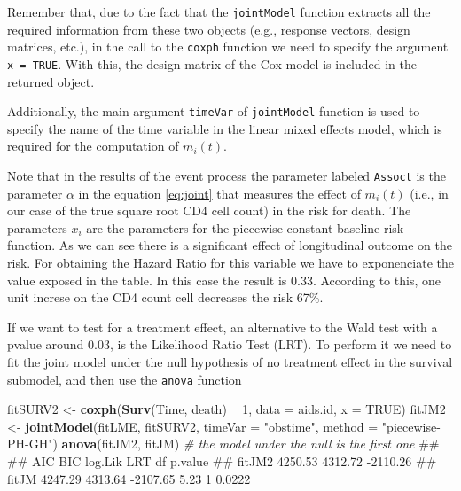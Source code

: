 \documentclass[]{book}
\makeatletter
\newenvironment{Shaded}{\begin{snugshade}}{\end{snugshade}}
\newcommand{\KeywordTok}[1]{\textcolor[rgb]{0.13,0.29,0.53}{\textbf{#1}}}
\newcommand{\DataTypeTok}[1]{\textcolor[rgb]{0.13,0.29,0.53}{#1}}
\newcommand{\DecValTok}[1]{\textcolor[rgb]{0.00,0.00,0.81}{#1}}
\newcommand{\StringTok}[1]{\textcolor[rgb]{0.31,0.60,0.02}{#1}}
\newcommand{\CommentTok}[1]{\textcolor[rgb]{0.56,0.35,0.01}{\textit{#1}}}
\newcommand{\OtherTok}[1]{\textcolor[rgb]{0.56,0.35,0.01}{#1}}
\newcommand{\OperatorTok}[1]{\textcolor[rgb]{0.81,0.36,0.00}{\textbf{#1}}}
\newcommand{\NormalTok}[1]{#1}
\newenvironment{kframe}{%
\medskip{}
\setlength{\fboxsep}{.8em}
 \def\at@end@of@kframe{}%
 \ifinner\ifhmode%
  \def\at@end@of@kframe{\end{minipage}}%
  \begin{minipage}{\columnwidth}%
 \fi\fi%
 \def\FrameCommand##1{\hskip\@totalleftmargin \hskip-\fboxsep
 \colorbox{shadecolor}{##1}\hskip-\fboxsep
     \hskip-\linewidth \hskip-\@totalleftmargin \hskip\columnwidth}%
 \MakeFramed {\advance\hsize-\width
   \@totalleftmargin\z@ \linewidth\hsize
   \@setminipage}}%
 {\par\unskip\endMakeFramed%
 \at@end@of@kframe}
\renewenvironment{Shaded}{\begin{kframe}}{\end{kframe}}
\theoremstyle{definition}
\theoremstyle{definition}
\theoremstyle{definition}
\theoremstyle{remark}
\let\BeginKnitrBlock\begin \let\EndKnitrBlock\end
\makeatother
\begin{document}
\BeginKnitrBlock{rmdhint_sestelo}
Remember that, due to the fact that the \texttt{jointModel} function
extracts all the required information from these two objects (e.g.,
response vectors, design matrices, etc.), in the call to the
\texttt{coxph} function we need to specify the argument
\texttt{x\ =\ TRUE}. With this, the design matrix of the Cox model is
included in the returned object.

Additionally, the main argument \texttt{timeVar} of \texttt{jointModel}
function is used to specify the name of the time variable in the linear
mixed effects model, which is required for the computation of
\(m_i(t)\).
\EndKnitrBlock{rmdhint_sestelo}

Note that in the results of the event process the parameter labeled
\texttt{Assoct} is the parameter \(\alpha\) in the equation
\eqref{eq:joint} that measures the effect of \(m_i(t)\) (i.e., in our case
of the true square root CD4 cell count) in the risk for death. The
parameters \(x_i\) are the parameters for the piecewise constant
baseline risk function. As we can see there is a significant effect of
longitudinal outcome on the risk. For obtaining the Hazard Ratio for
this variable we have to exponenciate the value exposed in the table. In
this case the result is 0.33. According to this, one unit increse on the
CD4 count cell decreases the risk 67\%.

If we want to test for a treatment effect, an alternative to the Wald
test with a pvalue around 0.03, is the Likelihood Ratio Test (LRT). To
perform it we need to fit the joint model under the null hypothesis of
no treatment effect in the survival submodel, and then use the
\texttt{anova} function

\begin{Shaded}
\begin{Highlighting}[]
\NormalTok{fitSURV2 <-}\StringTok{ }\KeywordTok{coxph}\NormalTok{(}\KeywordTok{Surv}\NormalTok{(Time, death) }\OperatorTok{~}\StringTok{ }\DecValTok{1}\NormalTok{, }\DataTypeTok{data =}\NormalTok{ aids.id, }\DataTypeTok{x =} \OtherTok{TRUE}\NormalTok{)}
\NormalTok{fitJM2 <-}\StringTok{ }\KeywordTok{jointModel}\NormalTok{(fitLME, fitSURV2, }\DataTypeTok{timeVar =} \StringTok{"obstime"}\NormalTok{, }\DataTypeTok{method =} \StringTok{"piecewise-PH-GH"}\NormalTok{)}
\KeywordTok{anova}\NormalTok{(fitJM2, fitJM) }\CommentTok{# the model under the null is the first one}
\NormalTok{## }
\NormalTok{##            AIC     BIC  log.Lik  LRT df p.value}
\NormalTok{## fitJM2 4250.53 4312.72 -2110.26                }
\NormalTok{## fitJM  4247.29 4313.64 -2107.65 5.23  1  0.0222}
\end{Highlighting}
\end{Shaded}
\end{document}
